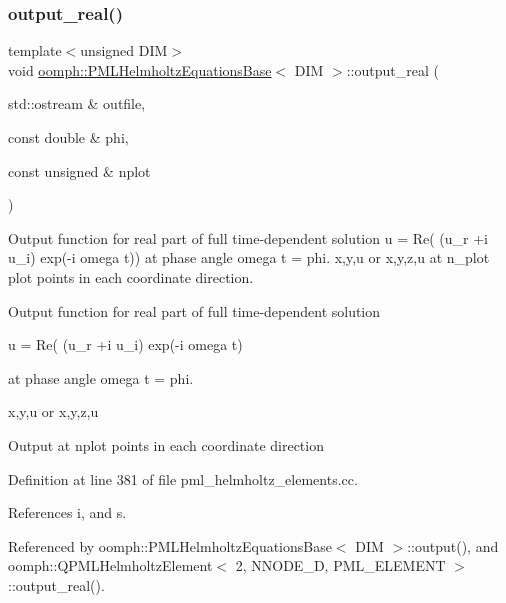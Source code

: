 \subsubsection{\texorpdfstring{output\+\_\+real()}{output\_real()}}
{\footnotesize\ttfamily template$<$unsigned D\+IM$>$ \\
void \hyperlink{classoomph_1_1PMLHelmholtzEquationsBase}{oomph\+::\+P\+M\+L\+Helmholtz\+Equations\+Base}$<$ D\+IM $>$\+::output\+\_\+real (\begin{DoxyParamCaption}\item[{std\+::ostream \&}]{outfile,  }\item[{const double \&}]{phi,  }\item[{const unsigned \&}]{nplot }\end{DoxyParamCaption})}



Output function for real part of full time-\/dependent solution u = Re( (u\+\_\+r +i u\+\_\+i) exp(-\/i omega t)) at phase angle omega t = phi. x,y,u or x,y,z,u at n\+\_\+plot plot points in each coordinate direction. 

Output function for real part of full time-\/dependent solution

u = Re( (u\+\_\+r +i u\+\_\+i) exp(-\/i omega t)

at phase angle omega t = phi.

x,y,u or x,y,z,u

Output at nplot points in each coordinate direction 

Definition at line 381 of file pml\+\_\+helmholtz\+\_\+elements.\+cc.



References i, and s.



Referenced by oomph\+::\+P\+M\+L\+Helmholtz\+Equations\+Base$<$ D\+I\+M $>$\+::output(), and oomph\+::\+Q\+P\+M\+L\+Helmholtz\+Element$<$ 2, N\+N\+O\+D\+E\+\_\+D, P\+M\+L\+\_\+\+E\+L\+E\+M\+E\+N\+T $>$\+::output\+\_\+real().

\mbox{\label{classoomph_1_1PMLHelmholtzEquationsBase_a84f505b170bda355042f0a56df1deb63}} 
